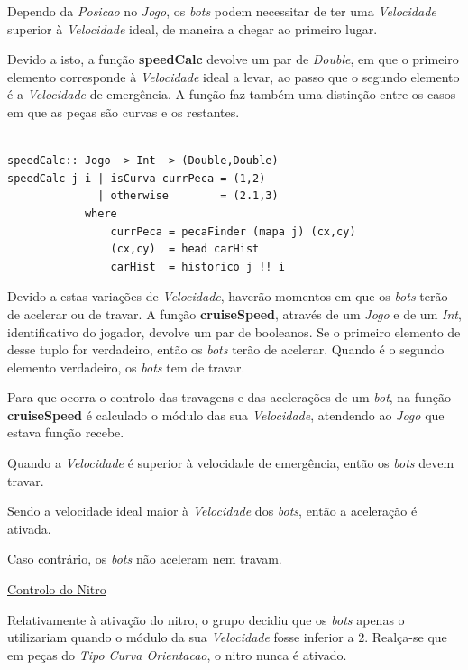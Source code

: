 \documentclass[a4paper]{report} %
\begin{document}
Dependo da \emph{Posicao} no \emph{Jogo}, os \textit{bots} podem necessitar de ter uma \emph{Velocidade} superior à \emph{Velocidade} ideal, de maneira a chegar ao primeiro lugar.

Devido a isto, a função \textbf{speedCalc} devolve um par de \emph{Double}, em que o primeiro elemento corresponde à \emph{Velocidade} ideal a levar, ao passo que o segundo elemento é a \emph{Velocidade} de emergência. A função faz também uma distinção entre os casos em que as peças são curvas e os restantes.

\begin{verbatim}

speedCalc:: Jogo -> Int -> (Double,Double)
speedCalc j i | isCurva currPeca = (1,2)
              | otherwise        = (2.1,3)
            where
                currPeca = pecaFinder (mapa j) (cx,cy)
                (cx,cy)  = head carHist
                carHist  = historico j !! i

\end{verbatim}

Devido a estas variações de \emph{Velocidade}, haverão momentos em que os \textit{bots} terão de acelerar ou de travar. A função \textbf{cruiseSpeed}, através de um \emph{Jogo} e de um \emph{Int}, identificativo do jogador, devolve um par de booleanos. Se o primeiro elemento de desse tuplo for verdadeiro, então os \textit{bots} terão de acelerar. Quando é o segundo elemento verdadeiro, os \textit{bots} tem de travar.

Para que ocorra o controlo das travagens e das acelerações de um \textit{bot}, na função \textbf{cruiseSpeed} é calculado o módulo das sua \emph{Velocidade}, atendendo ao \emph{Jogo} que estava função recebe. 

Quando a \emph{Velocidade} é superior à velocidade de emergência, então os \textit{bots} devem travar.

Sendo a velocidade ideal maior à \emph{Velocidade} dos \textit{bots}, então a aceleração é ativada.

Caso contrário, os \textit{bots} não aceleram nem travam.

\newpage

\maketitle\underline{Controlo do Nitro}

Relativamente à ativação do nitro, o grupo decidiu que os \textit{bots} apenas o utilizariam quando o módulo da sua \emph{Velocidade} fosse inferior a 2. Realça-se que em peças do \emph {Tipo} \emph{Curva Orientacao}, o nitro nunca é ativado.
\end{document}
